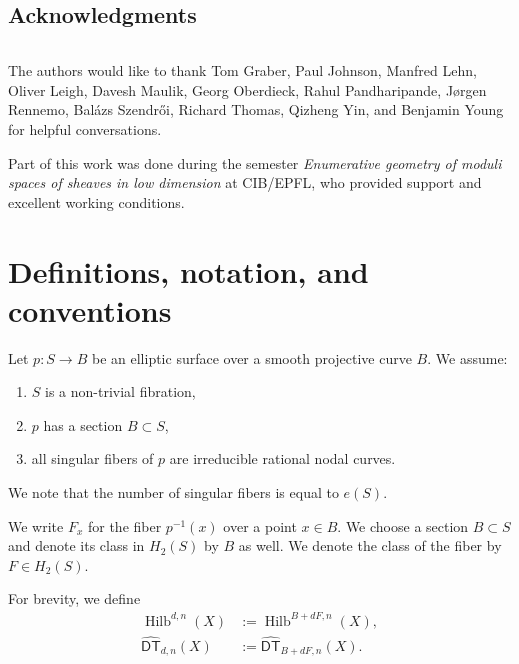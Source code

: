 \documentclass[12pt]{amsart}
\theoremstyle{definition}
\newcommand{\Hilb}{\operatorname{Hilb}}
\newcommand{\DT}{\mathsf{DT}}
\newcommand{\DThat}{\widehat{\DT}}
\newcommand{\presectionspace}{\vspace{0.2cm}} %
\newcommand{\SubSecSpace}{$\,$\vspace{0.2cm}\par } %
\begin{document}
\subsection{Acknowledgments}
\SubSecSpace

The authors would like to thank Tom Graber, Paul Johnson, Manfred
Lehn, Oliver Leigh, Davesh Maulik, Georg Oberdieck, Rahul
Pandharipande, J{\o}rgen Rennemo, Bal\'azs Szendr\H{o}i, Richard
Thomas, Qizheng Yin, and Benjamin Young for helpful conversations.

Part of this work was done during the semester \emph{Enumerative geometry 
of moduli spaces of sheaves in low dimension} at CIB/EPFL, who 
provided support and excellent working conditions.






\presectionspace
\section{Definitions, notation, and conventions}

Let $p : S \rightarrow B$ be an elliptic surface over a smooth
projective curve $B$. We assume:
\begin{enumerate}
\item $S$ is a non-trivial fibration,
\item $p$ has a section $B \subset S$,
\item all singular fibers of $p$ are irreducible rational nodal curves. 
\end{enumerate}
We note that the number of singular fibers is equal to $e(S)$.

We write $F_x$ for the fiber $p^{-1}(x)$ over a  point $x \in
B$. We choose a section $B \subset S$ and denote its class in $H_2(S)$
by $B$ as well. We denote the class of the fiber by $F \in H_2(S)$.


For brevity, we define
\begin{align*}
\Hilb^{d,n}(X) &:=\Hilb^{B+dF,n}(X), \\
\DThat _{d,n}(X) &:= \DThat_{B+dF,n}(X).
\end{align*}
\end{document}
